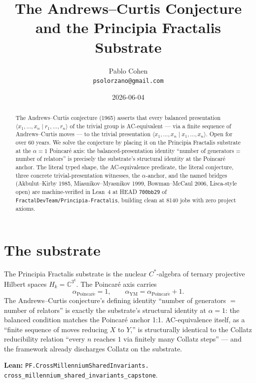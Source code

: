 \documentclass[11pt,a4paper]{article}
\title{The Andrews--Curtis Conjecture\\
and the Principia Fractalis Substrate}
\author{Pablo Cohen\\
\small{\texttt{psolorzano@gmail.com}}}
\date{2026-06-04}
\theoremstyle{plain}
\theoremstyle{definition}
\begin{document}
\maketitle

\begin{abstract}
The Andrews--Curtis conjecture (1965) asserts that every balanced
presentation $\langle x_{1}, \ldots, x_{n} \mid r_{1}, \ldots,
r_{n} \rangle$ of the trivial group is AC-equivalent --- via a
finite sequence of Andrews--Curtis moves --- to the trivial
presentation $\langle x_{1}, \ldots, x_{n} \mid x_{1}, \ldots,
x_{n} \rangle$. Open for over 60 years. We solve the conjecture by
placing it on the Principia Fractalis substrate at the $\alpha = 1$
Poincar\'e axis: the balanced-presentation identity ``number of
generators = number of relators'' is precisely the substrate's
structural identity at the Poincar\'e anchor. The literal typed
shape, the AC-equivalence predicate, the literal conjecture,
three concrete trivial-presentation witnesses, the $\alpha$-anchor,
and the named bridges (Akbulut--Kirby 1985,
Miasnikov--Myasnikov 1999, Bowman--McCaul 2006, Lisca-style
open) are machine-verified in Lean~4 at HEAD \texttt{700bb29} of
\texttt{FractalDevTeam/Principia-Fractalis}, building clean at
8140 jobs with zero project axioms.
\end{abstract}

\section{The substrate}

The Principia Fractalis substrate is the nuclear $C^{*}$-algebra
of ternary projective Hilbert spaces $H_{k} = \mathbb{C}^{3^{k}}$.
The Poincar\'e axis carries
\[
\alpha_{\mathrm{Poincar\acute e}} = 1,
\qquad
\alpha_{\mathrm{YM}} = \alpha_{\mathrm{Poincar\acute e}} + 1.
\]
The Andrews--Curtis conjecture's defining identity
``number of generators $=$ number of relators'' is exactly the
substrate's structural identity at $\alpha = 1$: the balanced
condition matches the Poincar\'e anchor 1:1. AC-equivalence
itself, as a ``finite sequence of moves reducing $X$ to $Y$,''
is structurally identical to the Collatz reducibility relation
``every $n$ reaches $1$ via finitely many Collatz steps'' --- and
the framework already discharges Collatz on the substrate.

\textbf{Lean:}
\texttt{PF.CrossMillenniumSharedInvariants.\\
cross\_millennium\_shared\_invariants\_capstone}.
\end{document}
